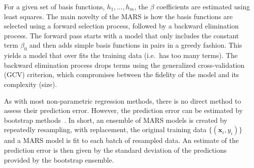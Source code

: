 For a given set of basis functions, $h_1, \dots, h_m$, the $\beta$ coefficients are estimated using least squares.
%
The main novelty of the MARS is how the basis functions are selected using a forward selection process, followed by a backward elimination process.
%
The forward pass starts with a model that only includes the constant term $\beta_0$ and then adds simple basis functions in pairs in a greedy fashion.
%
This yields a model that over fits the training data (i.e.\ has too many terms).
%
The backward elimination process drops terms using the generalized cross-validation (GCV) criterion, which compromises between the fidelity of the model and its complexity (size).

As with most non-parametric regression methods, there is no direct method to assess their prediction error.
%
However, the prediction error can be estimated by bootstrap methods~\cite{DavisonHinkley1997}.
%
In short, an ensemble of MARS models is created by repeatedly resampling, with replacement, the original training data $\{ (\mathbf{x}_i, y_i) \}$ and a MARS model is fit to each batch of resampled data.
%
An estimate of the prediction error is then given by the standard deviation of the predictions provided by the bootstrap ensemble.

